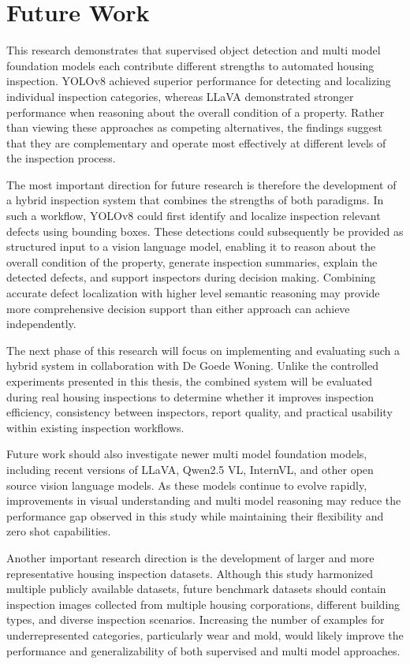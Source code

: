 \section{Future Work}
\label{sec:future_work}

This research demonstrates that supervised object detection and multi model foundation models each contribute different strengths to automated housing inspection. YOLOv8 achieved superior performance for detecting and localizing individual inspection categories, whereas LLaVA demonstrated stronger performance when reasoning about the overall condition of a property. Rather than viewing these approaches as competing alternatives, the findings suggest that they are complementary and operate most effectively at different levels of the inspection process.

The most important direction for future research is therefore the development of a hybrid inspection system that combines the strengths of both paradigms. In such a workflow, YOLOv8 could first identify and localize inspection relevant defects using bounding boxes. These detections could subsequently be provided as structured input to a vision language model, enabling it to reason about the overall condition of the property, generate inspection summaries, explain the detected defects, and support inspectors during decision making. Combining accurate defect localization with higher level semantic reasoning may provide more comprehensive decision support than either approach can achieve independently.

The next phase of this research will focus on implementing and evaluating such a hybrid system in collaboration with De Goede Woning. Unlike the controlled experiments presented in this thesis, the combined system will be evaluated during real housing inspections to determine whether it improves inspection efficiency, consistency between inspectors, report quality, and practical usability within existing inspection workflows.

Future work should also investigate newer multi model foundation models, including recent versions of LLaVA, Qwen2.5 VL, InternVL, and other open source vision language models. As these models continue to evolve rapidly, improvements in visual understanding and multi model reasoning may reduce the performance gap observed in this study while maintaining their flexibility and zero shot capabilities.

Another important research direction is the development of larger and more representative housing inspection datasets. Although this study harmonized multiple publicly available datasets, future benchmark datasets should contain inspection images collected from multiple housing corporations, different building types, and diverse inspection scenarios. Increasing the number of examples for underrepresented categories, particularly wear and mold, would likely improve the performance and generalizability of both supervised and multi model approaches.

